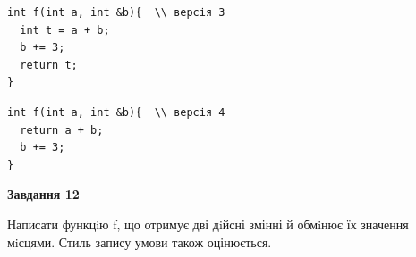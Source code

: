 \documentclass[12pt, ukrainian]{article}
\begin{document}
{\begin {large}
\begin{minipage}[t]{11.0cm}
\vspace{-8mm}\begin{verbatim}
int f(int a, int &b){  \\ версія 3
  int t = a + b;
  b += 3;
  return t;
}
\end{verbatim}

\vspace{-8mm}\begin{verbatim}
int f(int a, int &b){  \\ версія 4
  return a + b;
  b += 3;
}
\end{verbatim}



\begin{center}
\textbf{Завдання 12}
\end{center}

Написати функцiю f, що отримує дві дiйсні змінні й обмiнює їх значення мiсцями. Стиль запису умови також оцінюється.\par

\end{minipage}

\end {large}}
\newpage
\end{document}
